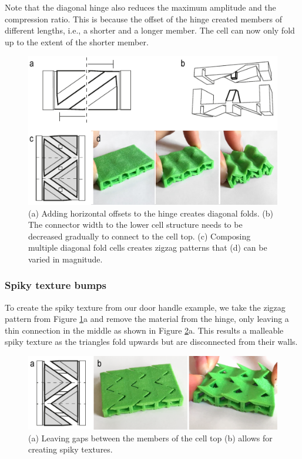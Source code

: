 Note that the diagonal hinge also reduces the maximum amplitude and the compression ratio. This is because the offset of the hinge created members of different lengths, i.e., a shorter and a longer member. The cell can now only fold up to the extent of the shorter member.

\begin{figure} [h]  
    \includegraphics[width=\textwidth]{chapters/metamaterial-textures-FIG/13-diagonal-explained.pdf}
    \caption[Short figure name.]{(a) Adding horizontal offsets to the hinge creates diagonal folds. (b) The connector width to the lower cell structure needs to be decreased gradually to connect to the cell top. (c) Composing multiple diagonal fold cells creates zigzag patterns that (d) can be varied in magnitude.
    \label{fig:13-diagonal-explained}}
\end{figure}

\subsubsection{Spiky texture bumps}
To create the spiky texture from our door handle example, we take the zigzag pattern from Figure \ref{fig:13-diagonal-explained}a and remove the material from the hinge, only leaving a thin connection in the middle as shown in Figure \ref{fig:14-spiky-patterns}a. This results a malleable spiky texture as the triangles fold upwards but are disconnected from their walls.

\begin{figure} [!h]  
    \includegraphics[width=\textwidth]{chapters/metamaterial-textures-FIG/14-spiky-patterns.pdf}
    \caption[Short figure name.]{(a) Leaving gaps between the members of the cell top (b) allows for creating spiky textures.
    \label{fig:14-spiky-patterns}}
\end{figure}

